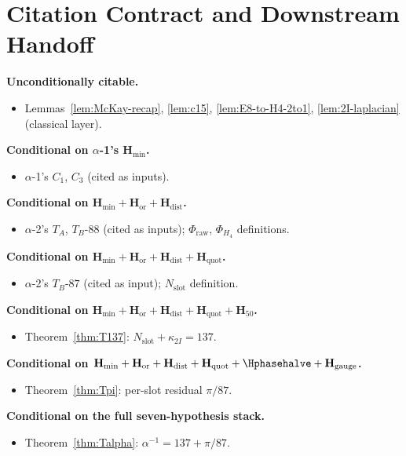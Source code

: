 \documentclass[11pt, a4paper]{amsart}
\theoremstyle{definition}
\newcommand{\Hmin}{\mathbf{H}_{\min}}
\newcommand{\Hor}{\mathbf{H}_{\mathrm{or}}}
\newcommand{\Hdist}{\mathbf{H}_{\mathrm{dist}}}
\newcommand{\Hquot}{\mathbf{H}_{\mathrm{quot}}}
\newcommand{\Hfifty}{\mathbf{H}_{50}}
\newcommand{\Hgauge}{\mathbf{H}_{\mathrm{gauge}}}
\newcommand{\Nslot}{N_{\mathrm{slot}}}
\newcommand{\kappaTwoI}{\kappa_{2I}}
\newcommand{\Phiraw}{\Phi_{\mathrm{raw}}}
\newcommand{\PhiHfour}{\Phi_{H_4}}
\begin{document}
\section{Citation Contract and Downstream Handoff}
\label{sec:handoff}

\textbf{Unconditionally citable.}
\begin{itemize}
\item Lemmas~\ref{lem:McKay-recap}, \ref{lem:c15},
  \ref{lem:E8-to-H4-2to1}, \ref{lem:2I-laplacian}
  (classical layer).
\end{itemize}

\textbf{Conditional on $\alpha$-1's $\Hmin$.}
\begin{itemize}
\item $\alpha$-1's $C_1$, $C_3$ (cited as inputs).
\end{itemize}

\textbf{Conditional on $\Hmin + \Hor + \Hdist$.}
\begin{itemize}
\item $\alpha$-2's $T_A$, $T_B$-$88$ (cited as inputs);
  $\Phiraw$, $\PhiHfour$ definitions.
\end{itemize}

\textbf{Conditional on $\Hmin + \Hor + \Hdist + \Hquot$.}
\begin{itemize}
\item $\alpha$-2's $T_B$-$87$ (cited as input); $\Nslot$
  definition.
\end{itemize}

\textbf{Conditional on $\Hmin + \Hor + \Hdist + \Hquot +
\Hfifty$.}
\begin{itemize}
\item Theorem~\ref{thm:T137}: $\Nslot + \kappaTwoI = 137$.
\end{itemize}

\textbf{Conditional on $\Hmin + \Hor + \Hdist + \Hquot +
\Hphasehalve + \Hgauge$.}
\begin{itemize}
\item Theorem~\ref{thm:Tpi}: per-slot residual $\pi/87$.
\end{itemize}

\textbf{Conditional on the full seven-hypothesis stack.}
\begin{itemize}
\item Theorem~\ref{thm:Talpha}: $\alpha^{-1} = 137 + \pi/87$.
\end{itemize}
\end{document}

